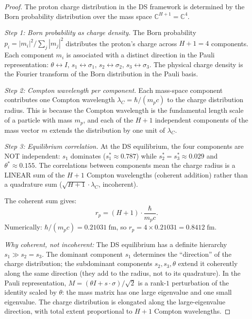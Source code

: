 \documentclass[11pt,a4paper]{article}
\theoremstyle{definition}
\theoremstyle{remark}
\newcommand{\C}{\mathbb{C}}
\begin{document}
\begin{proof}
The proton charge distribution in the DS framework is determined by the Born probability distribution over the mass space $\C^{H+1} = \C^4$.

\emph{Step 1: Born probability as charge density.}
The Born probability $p_i = |m_i|^2/\sum_j |m_j|^2$ distributes the proton's charge across $H+1 = 4$ components. Each component $m_i$ is associated with a distinct direction in the Pauli representation: $\theta \leftrightarrow I$, $s_1 \leftrightarrow \sigma_1$, $s_2 \leftrightarrow \sigma_2$, $s_3 \leftrightarrow \sigma_3$. The physical charge density is the Fourier transform of the Born distribution in the Pauli basis.

\emph{Step 2: Compton wavelength per component.}
Each mass-space component contributes one Compton wavelength $\lambda_C = \hbar/(m_p c)$ to the charge distribution radius. This is because the Compton wavelength is the fundamental length scale of a particle with mass $m_p$, and each of the $H+1$ independent components of the mass vector $m$ extends the distribution by one unit of $\lambda_C$.

\emph{Step 3: Equilibrium correlation.}
At the DS equilibrium, the four components are NOT independent: $s_1$ dominates ($s_1^* \approx 0.787$) while $s_2^* = s_3^* \approx 0.029$ and $\theta^* \approx 0.155$. The correlations between components mean the charge radius is a LINEAR sum of the $H+1$ Compton wavelengths (coherent addition) rather than a quadrature sum ($\sqrt{H+1} \cdot \lambda_C$, incoherent).

The coherent sum gives:
\[
r_p = (H+1) \cdot \frac{\hbar}{m_p c}.
\]
Numerically: $\hbar/(m_p c) = 0.21031\;\mathrm{fm}$, so $r_p = 4 \times 0.21031 = 0.8412\;\mathrm{fm}$.

\emph{Why coherent, not incoherent:} The DS equilibrium has a definite hierarchy $s_1 \gg s_2 = s_3$. The dominant component $s_1$ determines the ``direction'' of the charge distribution; the subdominant components $s_2, s_3, \theta$ extend it coherently along the same direction (they add to the radius, not to its quadrature). In the Pauli representation, $M = (\theta I + s \cdot \sigma)/\sqrt{2}$ is a rank-$1$ perturbation of the identity scaled by $\theta$: the mass matrix has one large eigenvalue and one small eigenvalue. The charge distribution is elongated along the large-eigenvalue direction, with total extent proportional to $H+1$ Compton wavelengths.
\end{proof}
\end{document}

